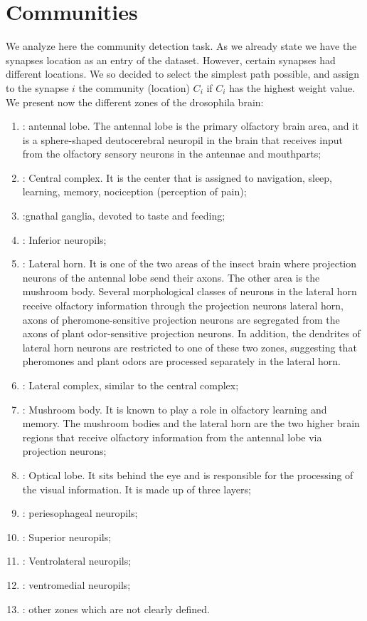 \section{Communities \label{sec:comm}}
We analyze here the community detection task. As we already state we have the synapses location
as an entry of the dataset. However, certain synapses had different locations. We so decided to
select the simplest path possible, and assign to the synapse $i$ the community (location) $C_i$
if $C_i$ has the highest weight value. We present now the different zones of the 
drosophila brain: 
\begin{enumerate}
    \item {}: antennal lobe.
        The antennal lobe is the primary olfactory brain area, and it is a sphere-shaped 
        deutocerebral neuropil in the brain that receives input from the olfactory sensory neurons 
        in the antennae and mouthparts;
    \item {}: Central complex. It is the center that is assigned to
         navigation, sleep, learning, memory, nociception (perception of pain);
    \item {}:gnathal ganglia, devoted to taste and feeding;
    \item {}: Inferior neuropils;
    \item {}: Lateral horn. It is one of the two areas of the insect brain where projection
         neurons of the antennal lobe send their axons. The other area is the mushroom body.
         Several morphological classes of neurons in the lateral horn receive olfactory 
         information through the projection neurons lateral horn, axons of 
         pheromone-sensitive projection neurons are segregated from the axons of 
         plant odor-sensitive projection neurons. In addition, the dendrites of lateral 
         horn neurons are restricted to one of these two zones, suggesting that pheromones 
         and plant odors are processed separately in the lateral horn.
    \item {}: Lateral complex, similar to the central complex;
    \item {}: Mushroom body. It is known to play a role in olfactory learning and memory. 
         The mushroom bodies and the lateral horn are the two higher brain regions that receive 
         olfactory information from the antennal lobe via projection neurons;
    \item {}: Optical lobe. It sits behind the eye and is responsible for the processing
         of the visual information. It is made up of three layers;
    \item {}: periesophageal neuropils;
    \item {}: Superior neuropils;
    \item {}: Ventrolateral neuropils;
    \item {}: ventromedial neuropils;
    \item {}: other zones which are not clearly defined.
\end{enumerate}
